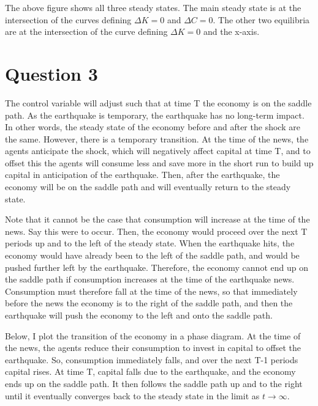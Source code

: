 \documentclass[11pt]{article} %
\begin{document}
The above figure shows all three steady states. The main steady state is at the intersection of the curves defining $\Delta K = 0$ and $\Delta C = 0$. The other two equilibria are at the intersection of the curve defining $\Delta K = 0$ and the x-axis. 

\section{Question 3}
The control variable will adjust such that at time T the economy is on the saddle path. As the earthquake is temporary, the earthquake has no long-term impact. In other words, the steady state of the economy before and after the shock are the same. However, there is a temporary transition. At the time of the news, the agents anticipate the shock, which will negatively affect capital at time T, and to offset this the agents will consume less and save more in the short run to build up capital in anticipation of the earthquake. Then, after the earthquake, the economy will be on the saddle path and will eventually return to the steady state.

Note that it cannot be the case that consumption will increase at the time of the news. Say this were to occur. Then, the economy would proceed over the next T periods up and to the left of the steady state. When the earthquake hits, the economy would have already been to the left of the saddle path, and would be pushed further left by the earthquake. Therefore, the economy cannot end up on the saddle path if consumption increases at the time of the earthquake news. Consumption must therefore fall at the time of the news, so that immediately before the news the economy is to the right of the saddle path, and then the earthquake will push the economy to the left and onto the saddle path.

Below, I plot the transition of the economy in a phase diagram. At the time of the news, the agents reduce their consumption to invest in capital to offset the earthquake. So, consumption immediately falls, and over the next T-1 periods capital rises. At time T, capital falls due to the earthquake, and the economy ends up on the saddle path. It then follows the saddle path up and to the right until it eventually converges back to the steady state in the limit as $t\rightarrow \infty.$
\end{document}
